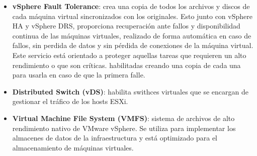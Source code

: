 \begin{itemize}
    \item \textbf{vSphere Fault Tolerance}: crea una copia de todos los archivos y discos de cada máquina virtual sincronizados con los originales. Esto junto con vSphere HA y vSphere DRS, proporciona recuperación ante fallos y  disponibilidad continua de las máquinas virtuales, realizado de forma automática en caso de fallos, sin perdida de datos y sin pérdida de conexiones de la máquina virtual. Este servicio está orientado a proteger aquellas tareas que requieren un alto rendimiento o que son críticas. habilitadas creando una copia de cada una  para usarla en caso de que la primera falle.
    
    \item \textbf{Distributed Switch (vDS)}: habilita swithces virtuales que se encargan de gestionar el tráfico de los hosts ESXi.
    
    \item \textbf{Virtual Machine File System (VMFS)}: sistema de archivos de alto rendimiento nativo de VMware vSphere. Se utiliza para implementar los almacenes de datos de la infraestructura y está optimizado para el almacenamiento de máquinas virtuales.
    
\end{itemize}


